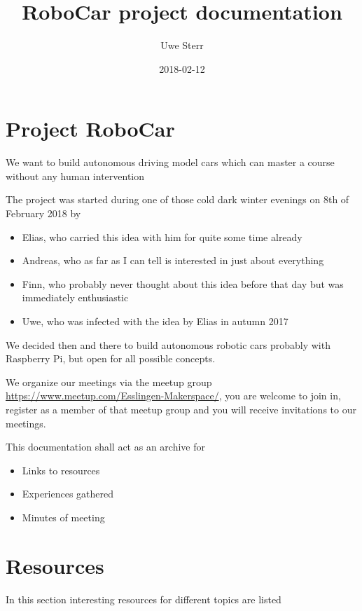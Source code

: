 \documentclass[]{book}
\title{RoboCar project documentation}
\author{Uwe Sterr}
\date{2018-02-12}
\providecommand{\tightlist}{%
  \setlength{\itemsep}{0pt}\setlength{\parskip}{0pt}}
\begin{document}
\maketitle

{
\setcounter{tocdepth}{1}
\tableofcontents
}
\chapter{Project RoboCar}\label{project-robocar}

We want to build autonomous driving model cars which can master a course
without any human intervention

The project was started during one of those cold dark winter evenings on
8th of February 2018 by

\begin{itemize}
\tightlist
\item
  Elias, who carried this idea with him for quite some time already
\item
  Andreas, who as far as I can tell is interested in just about
  everything
\item
  Finn, who probably never thought about this idea before that day but
  was immediately enthusiastic
\item
  Uwe, who was infected with the idea by Elias in autumn 2017
\end{itemize}

We decided then and there to build autonomous robotic cars probably with
Raspberry Pi, but open for all possible concepts.

We organize our meetings via the meetup group
\url{https://www.meetup.com/Esslingen-Makerspace/}, you are welcome to
join in, register as a member of that meetup group and you will receive
invitations to our meetings.

This documentation shall act as an archive for

\begin{itemize}
\tightlist
\item
  Links to resources
\item
  Experiences gathered
\item
  Minutes of meeting
\end{itemize}

\chapter{Resources}\label{resources}

In this section interesting resources for different topics are listed
\end{document}
